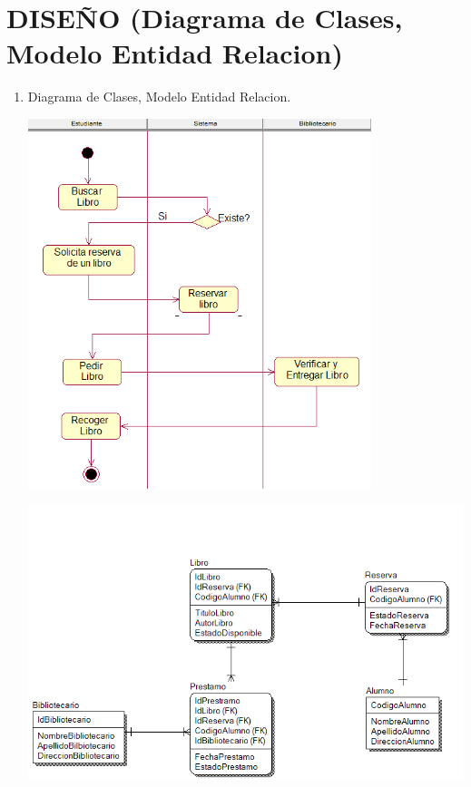 \section{ DISEÑO (Diagrama de Clases, Modelo Entidad Relacion)} 

\begin{enumerate}[1.]
	\item Diagrama de Clases, Modelo Entidad Relacion.
    



	
	\begin{center}
	\includegraphics[width=10cm]{./Imagenes/img6} 
	\end{center}
	
	\begin{center}
	\includegraphics[width=20cm]{./Imagenes/img8} 
	\end{center}
	
	
\end{enumerate} 
